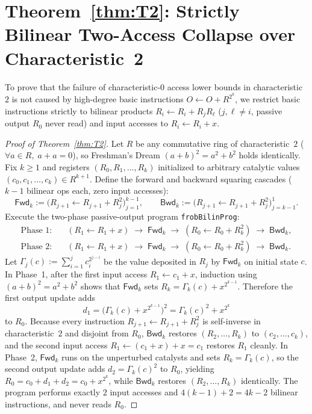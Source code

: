 \documentclass[11pt,reqno]{amsart}
\theoremstyle{definition}
\begin{document}
\section{Theorem~\ref{thm:T2}: Strictly Bilinear Two-Access Collapse over Characteristic~2}
\label{sec:T2}

To prove that the failure of characteristic-$0$ access lower bounds in characteristic~$2$ is not caused by high-degree basic instructions $O \leftarrow O + R^{2^k}$, we restrict basic instructions strictly to bilinear products $R_i \leftarrow R_i + R_j R_\ell$ ($j, \ell \neq i$, passive output $R_0$ never read) and input accesses to $R_i \leftarrow R_i + x$.

\begin{proof}[Proof of Theorem~\ref{thm:T2}]
Let $R$ be any commutative ring of characteristic~$2$ ($\forall a \in R,\; a + a = 0$), so Freshman's Dream $(a + b)^2 = a^2 + b^2$ holds identically.
Fix $k \ge 1$ and registers $(R_0, R_1, \dots, R_k)$ initialized to arbitrary catalytic values $(c_0, c_1, \dots, c_k) \in R^{k+1}$.
Define the forward and backward squaring cascades ($k - 1$ bilinear ops each, zero input accesses):
\[
  \mathsf{Fwd}_k := \bigl(R_{j+1} \leftarrow R_{j+1} + R_j^2\bigr)_{j=1}^{k-1},
  \qquad
  \mathsf{Bwd}_k := \bigl(R_{j+1} \leftarrow R_{j+1} + R_j^2\bigr)_{j=k-1}^{1}.
\]
Execute the two-phase passive-output program \texttt{frobBilinProg}:
\begin{align*}
  \text{Phase 1:}\quad & (R_1 \leftarrow R_1 + x)\;\to\;\mathsf{Fwd}_k\;\to\;(R_0 \leftarrow R_0 + R_k^2)\;\to\;\mathsf{Bwd}_k, \\
  \text{Phase 2:}\quad & (R_1 \leftarrow R_1 + x)\;\to\;\mathsf{Fwd}_k\;\to\;(R_0 \leftarrow R_0 + R_k^2)\;\to\;\mathsf{Bwd}_k.
\end{align*}
Let $\Gamma_j(c) := \sum_{i=1}^{j} c_i^{2^{j-i}}$ be the value deposited in $R_j$ by $\mathsf{Fwd}_k$ on initial state $c$.
In Phase~1, after the first input access $R_1 \leftarrow c_1 + x$, induction using $(a + b)^2 = a^2 + b^2$ shows that $\mathsf{Fwd}_k$ sets $R_k = \Gamma_k(c) + x^{2^{k-1}}$.
Therefore the first output update adds
\[
  d_1 = \bigl(\Gamma_k(c) + x^{2^{k-1}}\bigr)^2 = \Gamma_k(c)^2 + x^{2^k}
\]
to $R_0$.
Because every instruction $R_{j+1} \leftarrow R_{j+1} + R_j^2$ is self-inverse in characteristic~$2$ and disjoint from $R_0$, $\mathsf{Bwd}_k$ restores $(R_2, \dots, R_k)$ to $(c_2, \dots, c_k)$, and the second input access $R_1 \leftarrow (c_1 + x) + x = c_1$ restores $R_1$ cleanly.
In Phase~2, $\mathsf{Fwd}_k$ runs on the unperturbed catalysts and sets $R_k = \Gamma_k(c)$, so the second output update adds $d_2 = \Gamma_k(c)^2$ to $R_0$, yielding $R_0 = c_0 + d_1 + d_2 = c_0 + x^{2^k}$, while $\mathsf{Bwd}_k$ restores $(R_2, \dots, R_k)$ identically.
The program performs exactly $2$ input accesses and $4(k - 1) + 2 = 4k - 2$ bilinear instructions, and never reads $R_0$.
\end{proof}
\end{document}

